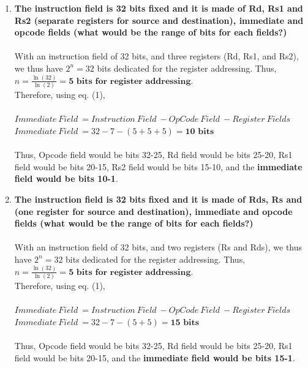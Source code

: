 \documentclass{article}
\begin{document}
\begin{enumerate}
\begin{enumerate}
        \item \textbf{The instruction field is 32 bits fixed and it is made of Rd, Rs1 and Rs2 (separate registers for source and destination), immediate and opcode fields (what would be the range of bits for each fields?)} \\ \\
        With an instruction field of 32 bits, and three registers (Rd, Rs1, and Rs2), we thus have $2^n = 32$ bits dedicated for the register addressing. Thus, $n = \frac{\ln(32)}{\ln(2)}= \textbf{5 bits for register addressing}$. \\
        Therefore, using eq. (1), \\ \\
        $Immediate\ Field\ = Instruction\ Field\ - OpCode\ Field\ - Register\ Fields $ \\
        $Immediate\ Field\ = 32 - 7 - (5+5+5) = \textbf{10 bits} $\\ \\
        Thus, Opcode field would be bits 32-25, Rd field would be bits 25-20, Rs1 field would be bits 20-15, Rs2 field would be bits 15-10, and the \textbf{immediate field would be bits 10-1}. \\ 
        \newpage
        
       \item \textbf{The instruction field is 32 bits fixed and it is made of Rds, Rs and (one register for source and destination), immediate and opcode fields (what would be the range of bits for each fields?)} \\ \\
        With an instruction field of 32 bits, and two registers (Rs and Rds), we thus have $2^n = 32$ bits dedicated for the register addressing. Thus, $n = \frac{\ln(32)}{\ln(2)}= \textbf{5 bits for register addressing}$. \\
        Therefore, using eq. (1), \\ \\
        $Immediate\ Field\ = Instruction\ Field\ - OpCode\ Field\ - Register\ Fields $ \\
        $Immediate\ Field\ = 32 - 7 - (5+5) = \textbf{15 bits} $\\ \\
        Thus, Opcode field would be bits 32-25, Rd field would be bits 25-20, Rs1 field would be bits 20-15, and the \textbf{immediate field would be bits 15-1}. \\ 
        
	\end{enumerate}
	

\end{enumerate}
\end{document}
